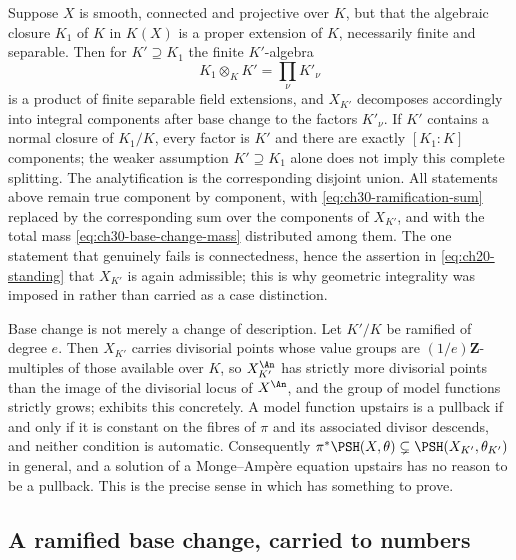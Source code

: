 \begin{remark}
\label{rem:ch30-not-geometrically-integral}
Suppose \(X\) is smooth, connected and projective over \(K\), but that the
algebraic closure \(K_1\) of \(K\) in \(K(X)\) is a proper extension of
\(K\), necessarily finite and separable.  Then for \(K'\supseteq K_1\) the
finite \(K'\)-algebra
\[
                         K_1\otimes_KK'=\prod_\nu K'_\nu
\]
is a product of finite separable field extensions, and \(X_{K'}\) decomposes
accordingly into integral components after base change to the factors
\(K'_\nu\).  If \(K'\) contains a normal closure of \(K_1/K\), every factor
is \(K'\) and there are exactly \([K_1:K]\) components; the weaker
assumption \(K'\supseteq K_1\) alone does not imply this complete splitting.
The analytification is the corresponding disjoint union.  All statements
above remain true component by component,
with \eqref{eq:ch30-ramification-sum} replaced by the corresponding sum
over the components of \(X_{K'}\), and with the total mass
\eqref{eq:ch30-base-change-mass} distributed among them.  The one statement
that genuinely fails is connectedness, hence the assertion in
\eqref{eq:ch20-standing} that \(X_{K'}\) is again admissible; this is why
geometric integrality was imposed in  rather than
carried as a case distinction.
\end{remark}

\begin{remark}
\label{rem:ch30-psh-grows}
Base change is not merely a change of description.  Let \(K'/K\) be
ramified of degree \(e\).  Then \(X_{K'}\) carries divisorial points whose
value groups are \((1/e)\mathbf Z\)-multiples of those available over
\(K\), so \(X_{K'}^{\An}\) has strictly more divisorial points than the
image of the divisorial locus of \(X^{\An}\), and the group of model
functions strictly grows;  exhibits this
concretely.  A model function upstairs is a pullback if and only if it is
constant on the fibres of \(\pi\) and its associated divisor descends, and
neither condition is automatic.  Consequently
\(\pi^*\PSH(X,\theta)\subsetneq\PSH(X_{K'},\theta_{K'})\) in general, and a
solution of a Monge--Amp\`ere equation upstairs has no reason to be a
pullback.  This is the precise sense in which
 has something to prove.
\end{remark}

\subsection{A ramified base change, carried to numbers}
\label{sec:ch30-bc-example}

